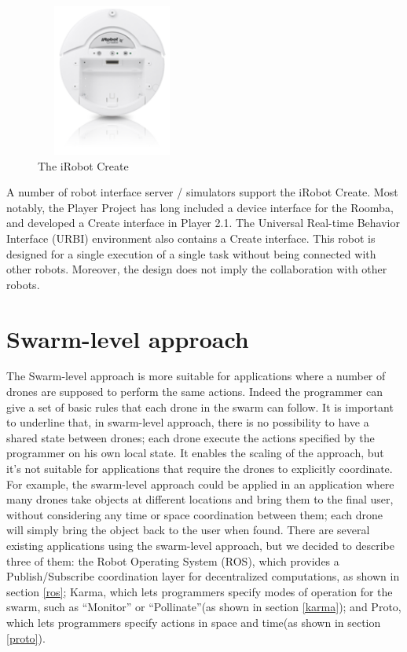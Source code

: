 \begin{figure}[H]
  \centering
  \includegraphics[width=5cm,height=5cm]{pictures/Irobot.png}
  \caption{The iRobot Create}
  \label{fig:irobot}
\end{figure}

A number of robot interface server / simulators support the iRobot Create. Most notably, the Player Project has long included a device interface for the Roomba, and developed a Create interface in Player 2.1. The Universal Real-time Behavior Interface (URBI) environment also contains a Create interface.
This robot is designed for a single execution of a single task without being connected with other robots. Moreover, the design does not imply the collaboration with other robots.
\\

\section{Swarm-level approach}\label{swarmLevel}

The Swarm-level approach\cite{swarm} is more suitable for applications where a number of drones are supposed to perform the same actions. Indeed the programmer can give a set of basic rules that each drone in the swarm can follow.
It is important to underline that, in swarm-level approach, there is no possibility to have a shared state between drones; each drone execute the actions specified by the programmer on his own local state.
It enables the scaling of the approach, but it's not suitable for applications that require the drones to explicitly coordinate.
For example, the swarm-level approach could be applied in an application where many drones take objects at different locations and bring them to the final user, without considering any time or space coordination between them; each drone will simply bring the object back to the user when found.  
There are several existing applications using the swarm-level approach, but we decided to describe three of them:
the Robot Operating System (ROS)\cite{ros}, which provides a Publish/Subscribe coordination layer for decentralized computations, as shown in section \ref{ros}; Karma\cite{karma}, which lets programmers specify modes of operation for the swarm, such as “Monitor” or “Pollinate”(as shown in section \ref{karma}); and Proto\cite{proto}, which lets programmers specify actions in space and time(as shown in section \ref{proto}). 

